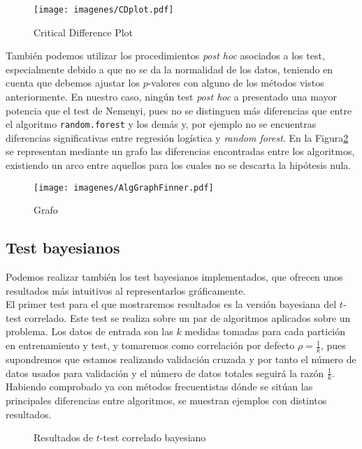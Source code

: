 \begin{figure}[H]
\label{fig:cdplot}
\centering
\caption{Critical Difference Plot}
\texttt{[image: imagenes/CDplot.pdf]}
\end{figure}

	También podemos utilizar los procedimientos \textit{post
hoc} asociados a los test, especialmente debido a que no
se da la normalidad de los datos, teniendo en cuenta que
debemos ajustar los $p$-valores con alguno de los métodos
vistos anteriormente. En nuestro caso, ningún test 
\textit{post hoc} a presentado una mayor potencia que el
test de Nemenyi, pues no se distinguen más diferencias que 
entre el algoritmo \texttt{random.forest} y los demás y, por
ejemplo no se encuentras diferencias significativas entre  
regresión logística y \textit{random forest}. En la Figura\ref{fig:grafo}
se representan mediante un grafo las diferencias encontradas
entre los algoritmos, existiendo un arco entre aquellos 
para los cuales no se descarta la hipótesis nula.

\begin{figure}[H]
\centering
\caption{Grafo}
\label{fig:grafo}
\texttt{[image: imagenes/AlgGraphFinner.pdf]}
\end{figure}

\subsection*{Test bayesianos}

	Podemos realizar también los test bayesianos implementados, 
que ofrecen unos resultados más intuitivos al representarlos
gráficamente.\\
	El primer test para el que mostraremos resultados es
la versión bayesiana del $t$-test correlado. Este test
se realiza sobre un par de algoritmos aplicados sobre un
problema. Los datos de entrada son las $k$ medidas tomadas
para cada partición en entrenamiento y test, y tomaremos 
como correlación por defecto $\rho = \frac{1}{k}$, pues
supondremos que estamos realizando validación cruzada y 
por tanto el número de datos usados para validación y el 
número de datos totales seguirá la razón $\frac{1}{k}$.\\
Habiendo comprobado ya con métodos frecuentistas dónde se
sitúan las principales diferencias entre algoritmos, se
muestran ejemplos con distintos resultados.

\begin{figure}[H]
\centering
{}
   \newline
   \centering
\caption{Resultados de $t$-test correlado bayesiano}
\end{figure}

